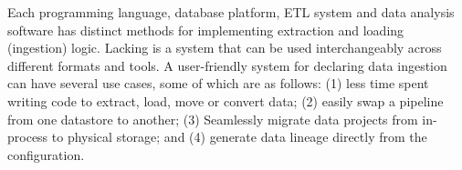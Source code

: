 Each programming language, database platform, ETL system and data
analysis software has distinct methods for implementing extraction and
loading (ingestion) logic. Lacking is a system that can be used
interchangeably across different formats and tools. A user-friendly
system for declaring data ingestion can have several use cases, some of
which are as follows: (1) less time spent writing code to extract, load,
move or convert data; (2) easily swap a pipeline from one datastore to
another; (3) Seamlessly migrate data projects from in-process to
physical storage; and (4) generate data lineage directly from the
configuration.
